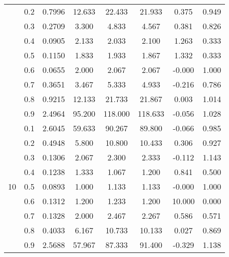 \documentclass[11pt,a4paper]{report}
\begin{document}
\begin{longtable}{ | c | c || c | c | c | c | c | c | }
 & 0.2 & 0.7996 & 12.633 & 22.433 & 21.933 & 0.375 & 0.949 \\
 & 0.3 & 0.2709 & 3.300 & 4.833 & 4.567 & 0.381 & 0.826 \\
 & 0.4 & 0.0905 & 2.133 & 2.033 & 2.100 & 1.263 & 0.333 \\
 & 0.5 & 0.1150 & 1.833 & 1.933 & 1.867 & 1.332 & 0.333 \\
 & 0.6 & 0.0655 & 2.000 & 2.067 & 2.067 & -0.000 & 1.000 \\
 & 0.7 & 0.3651 & 3.467 & 5.333 & 4.933 & -0.216 & 0.786 \\
 & 0.8 & 0.9215 & 12.133 & 21.733 & 21.867 & 0.003 & 1.014 \\
 & 0.9 & 2.4964 & 95.200 & 118.000 & 118.633 & -0.056 & 1.028 \\
 \hline
\multirow{9}{*}{10} & 0.1 & 2.6045 & 59.633 & 90.267 & 89.800 & -0.066 & 0.985 \\
 & 0.2 & 0.4948 & 5.800 & 10.800 & 10.433 & 0.306 & 0.927 \\
 & 0.3 & 0.1306 & 2.067 & 2.300 & 2.333 & -0.112 & 1.143 \\
 & 0.4 & 0.1238 & 1.333 & 1.067 & 1.200 & 0.841 & 0.500 \\
 & 0.5 & 0.0893 & 1.000 & 1.133 & 1.133 & -0.000 & 1.000 \\
 & 0.6 & 0.1312 & 1.200 & 1.233 & 1.200 & 10.000 & 0.000 \\
 & 0.7 & 0.1328 & 2.000 & 2.467 & 2.267 & 0.586 & 0.571 \\
 & 0.8 & 0.4033 & 6.167 & 10.733 & 10.133 & 0.027 & 0.869 \\
 & 0.9 & 2.5688 & 57.967 & 87.333 & 91.400 & -0.329 & 1.138 \\
 \hline
\hline
\end{longtable}
\end{document}

